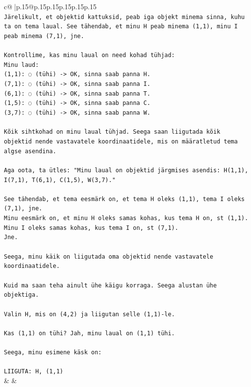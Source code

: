 \documentclass{article}
\begin{document}
{\begin{supertabular}{c@{$\;$}|p{.15\linewidth}@{}p{.15\linewidth}p{.15\linewidth}p{.15\linewidth}p{.15\linewidth}p{.15\linewidth}}
{{{\\ 
\texttt{Järelikult, et objektid kattuksid, peab iga objekt minema sinna, kuhu ta on tema laual. See tähendab, et minu H peab minema (1,1), minu I peab minema (7,1), jne.} \\
\\ 
\texttt{Kontrollime, kas minu laual on need kohad tühjad:} \\
\texttt{Minu laud:} \\
\texttt{(1,1): ◌ (tühi) {-}> OK, sinna saab panna H.} \\
\texttt{(7,1): ◌ (tühi) {-}> OK, sinna saab panna I.} \\
\texttt{(6,1): ◌ (tühi) {-}> OK, sinna saab panna T.} \\
\texttt{(1,5): ◌ (tühi) {-}> OK, sinna saab panna C.} \\
\texttt{(3,7): ◌ (tühi) {-}> OK, sinna saab panna W.} \\
\\ 
\texttt{Kõik sihtkohad on minu laual tühjad. Seega saan liigutada kõik objektid nende vastavatele koordinaatidele, mis on määratletud tema algse asendina.} \\
\\ 
\texttt{Aga oota, ta ütles: "Minu laual on objektid järgmises asendis: H(1,1), I(7,1), T(6,1), C(1,5), W(3,7)."} \\
\\ 
\texttt{See tähendab, et tema eesmärk on, et tema H oleks (1,1), tema I oleks (7,1), jne.} \\
\texttt{Minu eesmärk on, et minu H oleks samas kohas, kus tema H on, st (1,1).} \\
\texttt{Minu I oleks samas kohas, kus tema I on, st (7,1).} \\
\texttt{Jne.} \\
\\ 
\texttt{Seega, minu käik on liigutada oma objektid nende vastavatele koordinaatidele.} \\
\\ 
\texttt{Kuid ma saan teha ainult ühe käigu korraga. Seega alustan ühe objektiga.} \\
\\ 
\texttt{Valin H, mis on (4,2) ja liigutan selle (1,1){-}le.} \\
\\ 
\texttt{Kas (1,1) on tühi? Jah, minu laual on (1,1) tühi.} \\
\\ 
\texttt{Seega, minu esimene käsk on:} \\
\\ 
\texttt{LIIGUTA: H, (1,1)} \\
            }
        }
    }
    & & \\ \\


\end{supertabular}}
\end{document}
